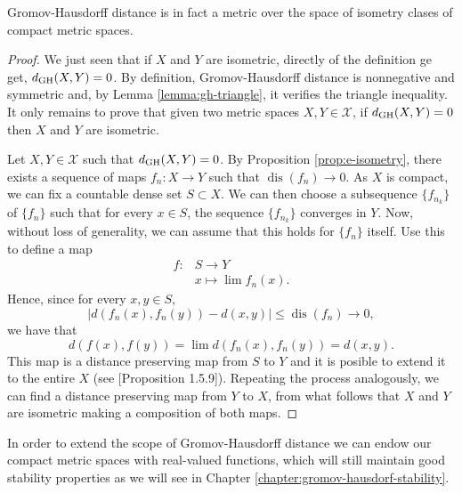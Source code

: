 \begin{theorem} \label{theorem:gh-distance}
    Gromov-Hausdorff distance is in fact a metric over the space of isometry clases of compact metric spaces.    
\end{theorem}
\begin{proof}
    We just seen that if $ X $ and $ Y $ are isometric, directly of the definition ge get, $ d_{\operatorname{GH}}(X, Y) = 0 $. By definition, Gromov-Hausdorff distance is nonnegative and symmetric and, by Lemma \ref{lemma:gh-triangle}, it verifies the triangle inequality. It only remains to prove that given two metric spaces $ X, Y \in \mathcal{X} $, if $ d_{\operatorname{GH}}(X, Y) = 0 $ then $ X $ and $ Y $ are isometric.  
    
    Let  $ X, Y \in \mathcal{X} $ such that $ d_{\operatorname{GH}}(X, Y) = 0 $. By Proposition \ref{prop:e-isometry}, there exists a sequence of maps $ f_n \colon X \to Y $ such that $ \operatorname{dis}(f_n) \to 0 $. As $ X $ is compact, we can fix a countable dense set $ S \subset X $. We can then choose a subsequence $\{f_{n_k} \}$ of $\{f_n\}$ such that for every $ x \in S $, the sequence $\{f_{n_k} \}$ converges in $ Y $. Now, without loss of generality, we can assume that this holds for $ \{f_n\} $ itself. Use this to define a map
    \begin{align}
        f\colon &S \to Y \\
        &x \mapsto \lim f_n(x).
    \end{align}
    Hence, since for every $ x, y \in S $,
    \begin{equation}
        |d(f_n(x), f_n(y)) - d(x, y)| \leq \operatorname{dis}(f_n) \to 0,
    \end{equation}
    we have that
    \begin{equation}
        d(f(x), f(y)) = \lim d(f_n(x), f_n(y)) = d(x, y).
    \end{equation} 
    This map is a distance preserving map from $ S $ to $ Y $ and it is posible to extend it to the entire $ X $ (see \cite{burago}[Proposition 1.5.9]). Repeating the process analogously, we can find a distance preserving map from $ Y $ to $ X $, from what follows that $ X $ and $ Y $ are isometric making a composition of both maps.
\end{proof}

In order to extend the scope of Gromov-Hausdorff distance we can endow our compact metric spaces with real-valued functions, which will still maintain good stability properties as we will see in Chapter \ref{chapter:gromov-hausdorf-stability}.

